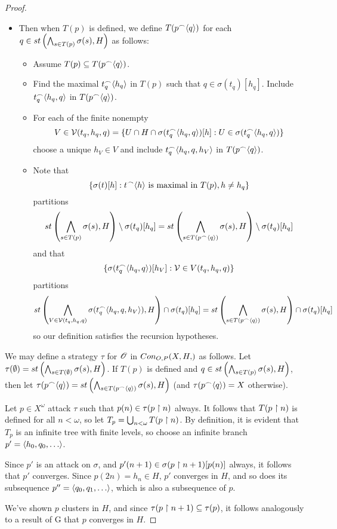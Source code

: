 \begin{proof}
\begin{itemize}
    \item Then when $T(p)$ is defined, we define $T(p^\frown\langle q\rangle)$ for each $q\in st\left(\bigwedge_{s\in T(p)}\sigma(s),H\right)$ as follows:
      \begin{itemize}
        \item Assume $T(p)\subseteq T(p^\frown\langle q\rangle)$.
        \item Find the maximal $t_q^\frown\langle h_q\rangle$ in $T(p)$ such that $q\in\sigma(t_q)[h_q]$. Include $t_q^\frown\langle h_q,q\rangle$ in $T(p^\frown\langle q\rangle)$.
        \item For each of the finite nonempty
          \[
            V\in\mathcal{V}(t_q,h_q,q)=\{U\cap H\cap \sigma(t_q^\frown\langle h_q,q\rangle)[h]: U\in \sigma(t_q^\frown\langle h_q,q\rangle)\}
          \]
          choose a unique $h_V\in V$ and include $t_q^\frown\langle h_q,q,h_V\rangle$ in $T(p^\frown\langle q\rangle)$.
        \item Note that 
          \[
            \{\sigma(t)[h]:t^\frown\langle h\rangle\text{ is maximal in }T(p), h\not= h_q\}
          \]
          partitions 
          \[
            st\left(\bigwedge_{s\in T(p)}\sigma(s),H\right)\setminus\sigma(t_q)[h_q] = st\left(\bigwedge_{s\in T(p^\frown\langle q\rangle)}\sigma(s),H\right)\setminus\sigma(t_q)[h_q]
          \]
          and that
          \[
            \{\sigma(t_q^\frown\langle h_q,q\rangle)[h_V]: \mathcal{V}\in V(t_q,h_q,q)\}
          \]
          partitions 
          \[
            st\left(\bigwedge_{V\in \mathcal{V}(t_q,h_q,q)}\sigma(t_q^\frown\langle h_q,q,h_V\rangle),H\right)\cap \sigma(t_q)[h_q] 
              = 
            st\left(\bigwedge_{s\in T(p^\frown\langle q\rangle)}\sigma(s),H\right)\cap\sigma(t_q)[h_q]
          \]
          so our definition satisfies the recursion hypotheses.
      \end{itemize}
  \end{itemize}

  We may define a strategy $\tau$ for $\mathscr{O}$ in $\congame{X,H}$ as follows. Let $\tau(\emptyset)=st\left(\bigwedge_{s\in T(\emptyset)}\sigma(s),H\right)$. If $T(p)$ is defined and $q\in st\left(\bigwedge_{s\in T(p)}\sigma(s),H\right)$, then let $\tau(p^\frown\langle q\rangle)=st\left(\bigwedge_{s\in T(p^\frown\langle q\rangle)}\sigma(s),H\right)$ (and $\tau(p^\frown\langle q\rangle)=X$ otherwise).

  Let $p\in X^\omega$ attack $\tau$ such that $p(n)\in\tau(p\restriction n)$ always. It follows that $T(p\restriction n)$ is defined for all $n<\omega$, so let $T_p=\bigcup_{n<\omega}T(p\restriction n)$. By definition, it is evident that $T_p$ is an infinite tree with finite levels, so choose an infinite branch $p'=\<h_0,q_0,\dots\>$.

  Since $p'$ is an attack on $\sigma$, and $p'(n+1)\in\sigma(p\restriction n+1)[p(n)]$ always, it follows that $p'$ converges. Since $p(2n)=h_n\in H$, $p'$ converges in $H$, and so does its subsequence $p''=\<q_0,q_1,\dots\>$, which is also a subsequence of $p$.

  We've shown $p$ clusters in $H$, and since $\tau(p\restriction n+1)\subseteq \tau(p)$, it follows analogously to a result of G that $p$ converges in $H$.
\end{proof}

